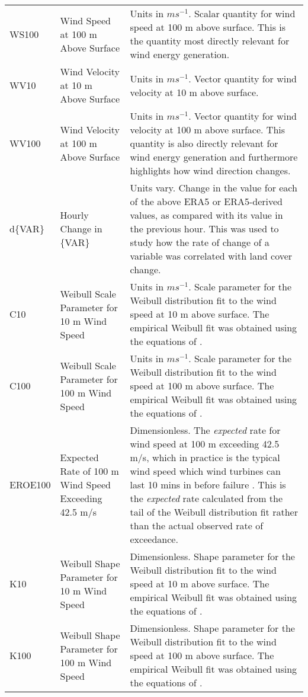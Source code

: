 \begin{landscape}
\begin{longtable}{P{2cm}P{3cm}P{13cm}}
		\acs{WS100} & Wind Speed at 100 m Above Surface & Units in $m s^{-1}$. Scalar quantity for wind speed at 100 m above surface. This is the quantity most directly relevant for wind energy generation. \\
		\acs{WV10} & Wind Velocity at 10 m Above Surface & Units in $m s^{-1}$. Vector quantity for wind velocity at 10 m above surface. \\
		\acs{WV100} & Wind Velocity at 100 m Above Surface & Units in $m s^{-1}$. Vector quantity for wind velocity at 100 m above surface. This quantity is also directly relevant for wind energy generation and furthermore highlights how wind direction changes. \\ \midrule
		d\{VAR\} & Hourly Change in \{VAR\} & Units vary. Change in the value for each of the above \ac{ERA5} or \ac{ERA5}-derived values, as compared with its value in the previous hour. This was used to study how the rate of change of a variable was correlated with land cover change. \\ \midrule
		\acs{C10} & Weibull Scale Parameter for 10 m Wind Speed & Units in $m s^{-1}$. Scale parameter for the Weibull distribution fit to the wind speed at 10 m above surface. The empirical Weibull fit was obtained using the equations of \citep{justus1977}. \\
		\acs{C100} & Weibull Scale Parameter for 100 m Wind Speed & Units in $m s^{-1}$. Scale parameter for the Weibull distribution fit to the wind speed at 100 m above surface. The empirical Weibull fit was obtained using the equations of \citep{justus1977}. \\
		\acs{EROE100} & Expected Rate of 100 m Wind Speed Exceeding 42.5 m/s & Dimensionless. The \textit{expected} rate for wind speed at 100 m exceeding 42.5 m/s, which in practice is the typical wind speed which wind turbines can last 10 mins in before failure \citep{chen2015, chen2016, ge_web}. This is the \textit{expected} rate calculated from the tail of the Weibull distribution fit rather than the actual observed rate of exceedance. \\
		\acs{K10} & Weibull Shape Parameter for 10 m Wind Speed & Dimensionless. Shape parameter for the Weibull distribution fit to the wind speed at 10 m above surface. The empirical Weibull fit was obtained using the equations of \citep{justus1977}. \\
		\acs{K100} & Weibull Shape Parameter for 100 m Wind Speed & Dimensionless. Shape parameter for the Weibull distribution fit to the wind speed at 100 m above surface. The empirical Weibull fit was obtained using the equations of \citep{justus1977}. \\

\end{longtable}
\end{landscape}
